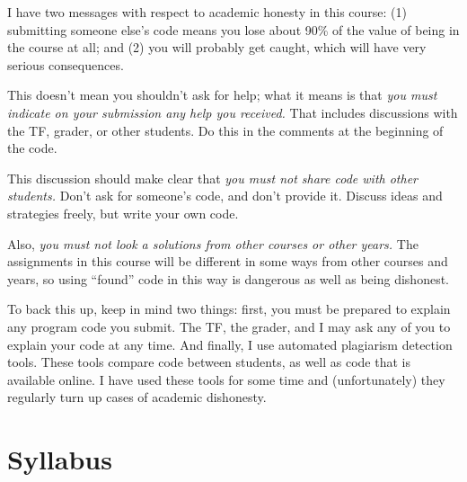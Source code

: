 \documentclass[11pt]{article}
\begin{document}
I have two messages with respect to academic honesty in this course: (1)
submitting someone else's code means you lose about 90\% of the value of
being in the course at all;  and (2) you will probably get caught, which
will have very serious consequences.

This doesn't mean you shouldn't ask for help;  what it means is that
\emph{you must indicate on your submission any help you received.}  That
includes discussions with the TF, grader, or other students.  Do this in
the comments at the beginning of the code.

This discussion should make clear that \emph{you must not share code
  with other students.}  Don't ask for someone's code, and don't provide
  it.  Discuss ideas and strategies freely, but write your own code.

Also, \emph{you must not look a solutions from other courses or other
  years.}  The assignments in this course will be different in some ways
  from other courses and years, so using ``found'' code in this way is
  dangerous as well as being dishonest.

To back this up, keep in mind two things:  first, you must be prepared
to explain any program code you submit.   The TF, the grader, and I may
ask any of you to explain your code at any time.   And finally, I use
automated plagiarism detection tools.  These tools compare code between
students, as well as code that is available online.  I have used these
tools for some time and (unfortunately) they regularly turn up cases of
academic dishonesty.

\newpage
\section*{Syllabus}
\end{document}

